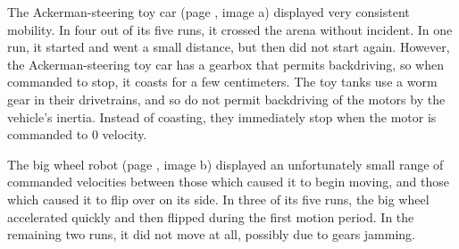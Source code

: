The Ackerman-steering toy car (page \pageref{img_traj}, image a) displayed very consistent mobility. In four out of its five runs, it crossed the arena without incident. 
In one run, it started and went a small distance, but then did not start again. 
However, the Ackerman-steering toy car has a gearbox that permits backdriving, so when commanded to stop, it coasts for a few centimeters. 
The toy tanks use a worm gear in their drivetrains, and so do not permit backdriving of the motors by the vehicle's inertia. 
Instead of coasting, they immediately stop when the motor is commanded to 0 velocity. 

The big wheel robot (page \pageref{img_traj}, image b) displayed an unfortunately small range of commanded velocities between those which caused it to begin moving, and those which caused it to flip over on its side.
In three of its five runs, the big wheel accelerated quickly and then flipped during the first motion period. 
In the remaining two runs, it did not move at all, possibly due to gears jamming. 

